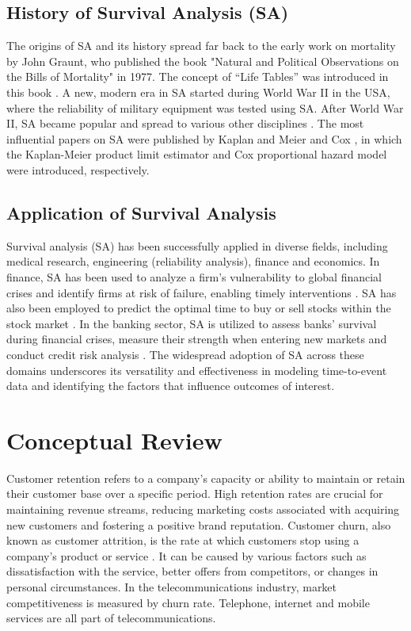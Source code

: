 \documentclass[doublespacing,12pt]{report}
\begin{document}
\subsection{History of Survival Analysis (SA)}
The origins of SA and its history spread far back to the early work on mortality by John Graunt, who published the book "Natural and Political Observations on the Bills of Mortality" in 1977. The concept of “Life Tables” was introduced in this book \cite{graunt1977natural}. A new, modern era in SA started during World War II in the USA, where the reliability of military equipment was tested using SA. After World War II, SA became popular and spread to various other disciplines \cite{Jerenz2008}. The most influential papers on SA were published by Kaplan and Meier \cite{Kaplan1958} and Cox \cite{cox1972multivariate}, in which the Kaplan-Meier product limit estimator and Cox proportional hazard model were introduced, respectively.

\subsection{Application of Survival Analysis}
Survival analysis (SA) has been successfully applied in diverse fields, including medical research, engineering (reliability analysis), finance and economics. In finance, SA has been used to analyze a firm's vulnerability to global financial crises and identify firms at risk of failure, enabling timely interventions \cite{Lee2014, Pereira2014, Kumar2015, Iwasaki2014}. SA has also been employed to predict the optimal time to buy or sell stocks within the stock market \cite{Kumar2015}. In the banking sector, SA is utilized to assess banks' survival during financial crises, measure their strength when entering new markets \cite{Leung2010, Evrensel2008} and conduct credit risk analysis \cite{Tsujitani2012, Baesens2005}. The widespread adoption of SA across these domains underscores its versatility and effectiveness in modeling time-to-event data and identifying the factors that influence outcomes of interest.

\section{Conceptual Review}

Customer retention refers to a company's capacity or ability to maintain or retain their customer base over a specific period. High retention rates are crucial for maintaining revenue streams, reducing marketing costs associated with acquiring new customers and fostering a positive brand reputation. Customer churn, also known as customer attrition, is the rate at which customers stop using a company's product or service \cite{Masarifoglu2019}. It can be caused by various factors such as dissatisfaction with the service, better offers from competitors, or changes in personal circumstances. In the telecommunications industry, market competitiveness is measured by churn rate. Telephone, internet and mobile services are all part of telecommunications.
\end{document}
